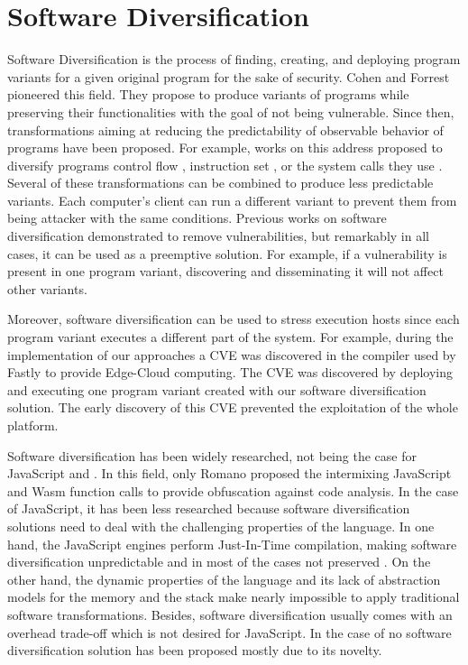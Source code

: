 \section{Software Diversification}

Software Diversification is the process of finding, creating, and deploying program variants for a given original program \cite{okhravi2013survey} for the sake of security.
Cohen \etal \cite{cohen1993operating} and Forrest \etal \cite{595185} pioneered this field. 
They propose to produce variants of programs while preserving their functionalities with the goal of not being vulnerable.
Since then, transformations aiming at reducing the predictability of observable behavior of programs have been proposed. For example, works on this address proposed to diversify programs control flow \cite{davi2015isomeron}, instruction set \cite{barrantes2003randomized}, or the system calls they use \cite{Chew02mitigatingbuffer}. 
Several of these transformations can be combined to produce less predictable variants.
Each computer's client can run a different variant to prevent them from being
attacker with the same conditions.
Previous works on software diversification demonstrated to remove vulnerabilities, but remarkably in all cases, it can be used as a preemptive solution.
For example, if a vulnerability is present in one program variant, discovering and disseminating it will not affect other variants.

Moreover, software diversification can be used to stress execution hosts since each program variant executes a different part of the system. For example, during the implementation of our approaches a CVE \cite{CVE} was discovered in the compiler used by Fastly to provide Edge-Cloud computing.
The CVE was discovered by deploying and executing one program variant created with our software diversification solution.
The early discovery of this CVE prevented the exploitation of the whole platform.


Software diversification has been widely researched, not being the case for JavaScript and \wasm.
In this field, only Romano \etal \cite{wobfuscator} proposed the intermixing JavaScript and Wasm function calls to provide obfuscation against code analysis. 
In the case of JavaScript, it has been less researched because software diversification solutions need to deal with the challenging properties of the language.
In one hand, the JavaScript engines perform Just-In-Time compilation, making software diversification unpredictable and in most of the cases not preserved \cite{STRAC}.
On the other hand, the dynamic properties of the language and its lack of abstraction models for the memory and the stack make nearly impossible to apply traditional software transformations.
Besides, software diversification usually comes with an overhead trade-off which is not desired for JavaScript. 
In the case of \wasm no software diversification solution has been proposed mostly due to its novelty.



